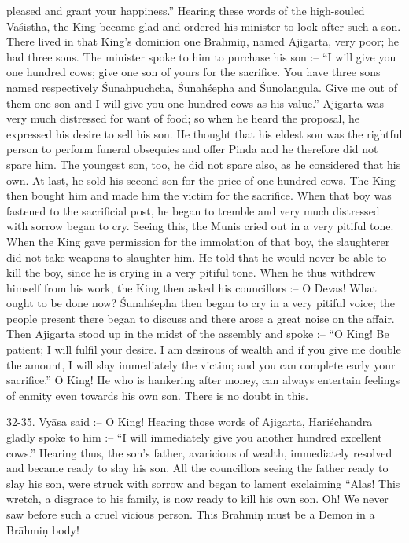 pleased and grant your happiness.'' Hearing these words of the high-souled Va\'sistha, the King became glad and ordered his minister to look after such a son. There lived in that King's dominion one Br\=ahmi\d{n}, named Ajigarta, very poor; he had three sons. The minister spoke to him to purchase his son :-- ``I will give you one hundred cows; give one son of yours for the sacrifice. You have three sons named respectively \'Sunahpuchcha, \'Sunah\'sepha and \'Sunolangula. Give me out of them one son and I will give you one hundred cows as his value.'' Ajigarta was very much distressed for want of food; so when he heard the proposal, he expressed his desire to sell his son. He thought that his eldest son was the rightful person to perform funeral obsequies and offer Pinda and he therefore did not spare him. The youngest son, too, he did not spare also, as he considered that his own. At last, he sold his second son for the price of one hundred cows. The King then bought him and made him the victim for the sacrifice. When that boy was fastened to the sacrificial post, he began to tremble and very much distressed with sorrow began to cry. Seeing this, the Munis cried out in a very pitiful tone. When the King gave permission for the immolation of that boy, the slaughterer did not take weapons to slaughter him. He told that he would never be able to kill the boy, since he is crying in a very pitiful tone. When he thus withdrew himself from his work, the King then asked his councillors :-- O Devas! What ought to be done now? \'Sunah\'sepha then began to cry in a very pitiful voice; the people present there began to discuss and there arose a great noise on the affair. Then Ajigarta stood up in the midst of the assembly and spoke :-- ``O King! Be patient; I will fulfil your desire. I am desirous of wealth and if you give me double the amount, I will slay immediately the victim; and you can complete early your sacrifice.'' O King! He who is hankering after money, can always entertain
feelings of enmity even towards his own son. There is no doubt in this.

32-35. Vy\=asa said :-- O King! Hearing those words of Ajigarta, Hari\'schandra gladly spoke to him :-- ``I will immediately give you another hundred excellent cows.'' Hearing thus, the son's father, avaricious of wealth, immediately resolved and became ready to slay his son. All the councillors seeing the father ready to slay his son, were struck with sorrow and began to lament exclaiming ``Alas! This wretch, a disgrace to his family, is now ready to kill his own son. Oh! We never saw before such a cruel vicious person. This Br\=ahmi\d{n} must be a Demon in a Br\=ahmi\d{n} body!

